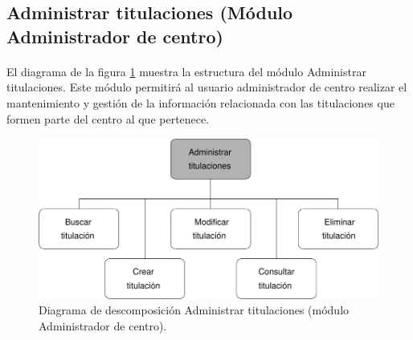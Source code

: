 \subsection{Administrar titulaciones (Módulo Administrador de centro)}

  \paragraph{}El diagrama de la figura
  \ref{diagramaDescomposicionAdministrarTitulaciones-admCentro} muestra la
  estructura del módulo Administrar titulaciones. Este módulo permitirá al
  usuario administrador de centro realizar el mantenimiento y gestión de la
  información relacionada con las titulaciones que formen parte del centro al
  que pertenece.

  \begin{figure}[!ht]
    \begin{center}
      \includegraphics[]{11.Disenyo_Arquitectonico/11.2.Diagramas_Descomposicion/11.2.3.Modulo_administrador_centro/AdministrarBBDD/AdministrarTitulaciones/Diagramas/administrar_titulaciones.pdf}
      \caption{Diagrama de descomposición Administrar titulaciones (módulo Administrador de centro).}
      \label{diagramaDescomposicionAdministrarTitulaciones-admCentro}
    \end{center}
  \end{figure}
